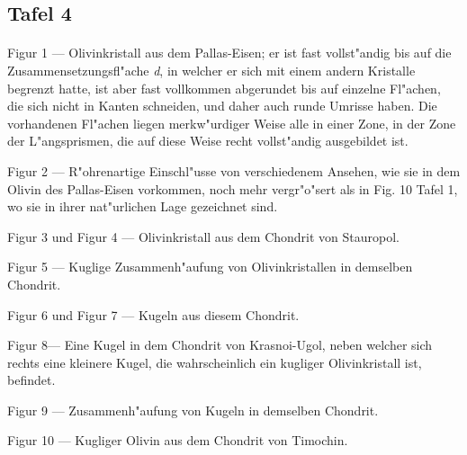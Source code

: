 \documentclass[a4paper, 11pt, oneside]{article}
\begin{document}
\subsection{Tafel 4}
\paragraph{}
Figur 1 --- Olivinkristall aus dem Pallas-Eisen; er ist fast vollst"andig bis auf die Zusammensetzungsfl"ache \emph{d}, in welcher er sich mit einem andern Kristalle begrenzt hatte, ist aber fast vollkommen abgerundet bis auf einzelne Fl"achen, die sich nicht in Kanten schneiden, und daher auch runde Umrisse haben. Die vorhandenen Fl"achen liegen merkw"urdiger Weise alle in einer Zone, in der Zone der L"angsprismen, die auf diese Weise recht vollst"andig ausgebildet ist.

Figur 2 --- R"ohrenartige Einschl"usse von verschiedenem Ansehen, wie sie in dem Olivin des Pallas-Eisen vorkommen, noch mehr vergr"o"sert als in Fig. 10 Tafel 1, wo sie in ihrer nat"urlichen Lage gezeichnet sind.

Figur 3 und Figur 4 --- Olivinkristall aus dem Chondrit von Stauropol.

Figur 5 --- Kuglige Zusammenh"aufung von Olivinkristallen in demselben Chondrit.

Figur 6 und Figur 7 --- Kugeln aus diesem Chondrit.

Figur 8--- Eine Kugel in dem Chondrit von Krasnoi-Ugol, neben welcher sich rechts eine kleinere Kugel, die wahrscheinlich ein kugliger Olivinkristall ist, befindet.

Figur 9 --- Zusammenh"aufung von Kugeln in demselben Chondrit.

Figur 10 --- Kugliger Olivin aus dem Chondrit von Timochin.
\end{document}
